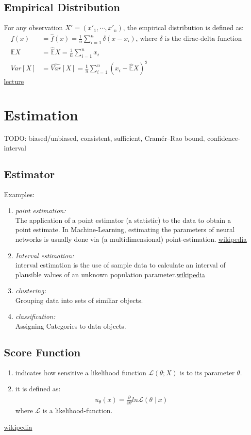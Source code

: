 \subsection{Empirical Distribution}
For any observation $X'=(x'_1, \cdots, x'_n)$, the empirical distribution is defined as:
\begin{align*}
	f(x) &= \hat{f}(x) =\frac{1}{n}\sum_{i=1}^{n}\delta(x - x_i)\text{, where $\delta$ is the dirac-delta function}\\
	\mathbb{E}X &= \hat{\mathbb{E}}X = \frac{1}{n}\sum_{i=1}^{n}x_i \\
	Var[X] &= \hat{Var}[X] =\frac{1}{n}\sum_{i=1}^{n}(x_i-\hat{\mathbb{E}}X)^2
\end{align*}
\href{http://www.stat.umn.edu/geyer/5102/slides/s1.pdf}{lecture}

\section{Estimation}
TODO: biased/unbiased, consistent, sufficient, Cramér–Rao bound, confidence-interval

\subsection{Estimator}
Examples:
\begin{enumerate}
	\item \textit{point estimation:}\\ The application of a point estimator (a statistic) to the data to obtain a point estimate. In Machine-Learning, estimating the parameters of neural networks is usually done via (a multidimensional) point-estimation. \href{https://en.wikipedia.org/wiki/Point_estimation}{wikipedia}
	\item \textit{Interval estimation:}\\ interval estimation is the use of sample data to calculate an interval of plausible values of an unknown population parameter.\href{https://en.wikipedia.org/wiki/Interval_estimation}{wikipedia}
	\item \textit{clustering:}\\ Grouping data into sets of similiar objects.
	\item \textit{classification:}\\ Assigning Categories to data-objects.
\end{enumerate}

\subsection{Score Function}
\begin{enumerate}
	\item indicates how sensitive a likelihood function $\displaystyle {\mathcal {L}}(\theta ;X)$ is to its parameter $\theta$.
	\item it is defined as:
	\begin{align*}
		u_\theta(x)=\frac{\partial}{\partial \theta}ln \mathcal{L}(\theta \mid x)\,
	\end{align*}
	where $\mathcal{L}$ is a likelihood-function.
\end{enumerate}
\href{https://en.wikipedia.org/wiki/Score_(statistics)}{wikipedia}

